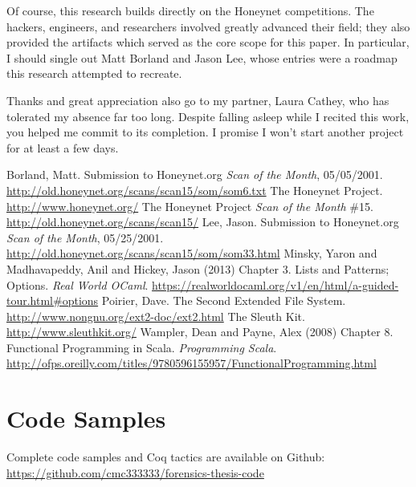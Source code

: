 \documentclass[nocopyrightspace]{sigplanconf}
\begin{document}
Of course, this research builds directly on the Honeynet competitions. The
hackers, engineers, and researchers involved greatly advanced their field;
they also provided the artifacts which served as the core scope for this
paper. In particular, I should single out Matt Borland and Jason Lee, whose
entries were a roadmap this research attempted to recreate.

Thanks and great appreciation also go to my partner, Laura Cathey, who has
tolerated my absence far too long. Despite falling asleep while I recited this
work, you helped me commit to its completion. I promise I won't start another
project for at least a few days.





\begin{thebibliography}{}
\softraggedright

  Borland, Matt. Submission to Honeynet.org \emph{Scan of the Month},
  05/05/2001. \url{http://old.honeynet.org/scans/scan15/som/som6.txt}
  The Honeynet Project. \url{http://www.honeynet.org/}
  The Honeynet Project \emph{Scan of the Month} \#15.
  \url{http://old.honeynet.org/scans/scan15/}
  Lee, Jason. Submission to Honeynet.org \emph{Scan of the Month}, 05/25/2001.
  \url{http://old.honeynet.org/scans/scan15/som/som33.html}
  Minsky, Yaron and Madhavapeddy, Anil and Hickey, Jason (2013) Chapter 3.
  Lists and Patterns; Options. {\em Real World OCaml}.
  \url{https://realworldocaml.org/v1/en/html/a-guided-tour.html#options}
  Poirier, Dave. The Second Extended File System.
  \url{http://www.nongnu.org/ext2-doc/ext2.html}
  The Sleuth Kit. \url{http://www.sleuthkit.org/}
  Wampler, Dean and Payne, Alex (2008) Chapter 8. Functional Programming in
  Scala. {\em Programming Scala}. 
  \url{http://ofps.oreilly.com/titles/9780596155957/FunctionalProgramming.html}

\end{thebibliography}

\appendix

\section{Code Samples}
Complete code samples and Coq tactics are available on Github:
\url{https://github.com/cmc333333/forensics-thesis-code}
\end{document}
